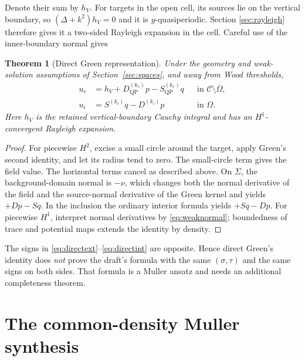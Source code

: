 \documentclass[11pt]{article}
\newcommand{\C}{\mathcal C}
\newcommand{\Om}{\Omega}
\newcommand{\Sig}{\Sigma}
\newcommand{\QP}{\mathrm{QP}}
\theoremstyle{plain}
\newtheorem{theorem}{Theorem}[section]
\theoremstyle{definition}
\theoremstyle{remark}
\begin{document}
Denote their sum by \(h_V\).  For targets in the open cell, its sources lie on
the vertical boundary, so
\((\Delta+k^2)h_V=0\) and it is \(y\)-quasiperiodic.  Section
\ref{sec:rayleigh} therefore gives it a two-sided Rayleigh expansion in the
cell.  Careful use of the inner-boundary normal gives
\begin{theorem}[Direct Green representation]
\label{thm:directgreen}
Under the geometry and weak-solution assumptions of Section~\ref{sec:spaces},
and away from Wood thresholds,
\begin{align}
u_e&=h_V+D_{\QP}^{(k_e)}p-S_{\QP}^{(k_e)}q
&&\text{in }\C\setminus\overline\Om,\label{eq:directext}\\
u_i&=S^{(k_i)}q-D^{(k_i)}p
&&\text{in }\Om.\label{eq:directint}
\end{align}
Here \(h_V\) is the retained vertical-boundary Cauchy integral and has an
\(H^1\)-convergent Rayleigh expansion.
\end{theorem}

\begin{proof}
For piecewise \(H^2\), excise a small circle around the target, apply Green's
second identity, and let its radius tend to zero.  The small-circle term gives
the field value.  The horizontal terms cancel as described above.  On
\(\Sig\), the background-domain normal is \(-\nu\), which changes both the
normal derivative of the field and the source-normal derivative of the Green
kernel and yields \(+Dp-Sq\).  In the inclusion the ordinary interior formula
yields \(+Sq-Dp\).  For piecewise \(H^1\), interpret normal derivatives by
\eqref{eq:weaknormal}; boundedness of trace and potential maps extends the
identity by density.
\end{proof}

The signs in \eqref{eq:directext}--\eqref{eq:directint} are opposite.  Hence
direct Green's identity does \emph{not} prove the draft's formula with the same
\((\sigma,\tau)\) and the same signs on both sides.  That formula is a Muller
ansatz and needs an additional completeness theorem.

\section{The common-density Muller synthesis}
\label{sec:muller}
\end{document}

